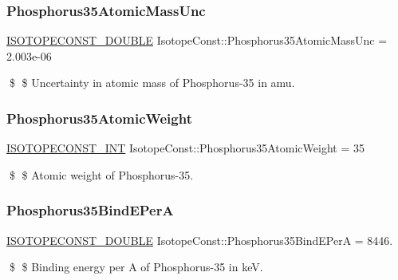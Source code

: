 \subsubsection{\texorpdfstring{Phosphorus35\+Atomic\+Mass\+Unc}{Phosphorus35AtomicMassUnc}}
{\footnotesize\ttfamily \mbox{\hyperlink{group___isotope_const-_macros_ga8f45a7272ce02c0b4c65c44636ed719a}{I\+S\+O\+T\+O\+P\+E\+C\+O\+N\+S\+T\+\_\+\+D\+O\+U\+B\+LE}} Isotope\+Const\+::\+Phosphorus35\+Atomic\+Mass\+Unc = 2.\+003e-\/06}

\$ \$ Uncertainty in atomic mass of Phosphorus-\/35 in amu. \mbox{\label{group___isotope_const-_phosphorus-_p35_gad01a86347b86b9b65ff7bbb74ddfff47}} 
\subsubsection{\texorpdfstring{Phosphorus35\+Atomic\+Weight}{Phosphorus35AtomicWeight}}
{\footnotesize\ttfamily \mbox{\hyperlink{group___isotope_const-_macros_ga5f18360b3e99483a35c32d789e62621c}{I\+S\+O\+T\+O\+P\+E\+C\+O\+N\+S\+T\+\_\+\+I\+NT}} Isotope\+Const\+::\+Phosphorus35\+Atomic\+Weight = 35}

\$ \$ Atomic weight of Phosphorus-\/35. \mbox{\label{group___isotope_const-_phosphorus-_p35_gac97c6063beba9404da470d5dcb517b99}} 
\subsubsection{\texorpdfstring{Phosphorus35\+Bind\+E\+PerA}{Phosphorus35BindEPerA}}
{\footnotesize\ttfamily \mbox{\hyperlink{group___isotope_const-_macros_ga8f45a7272ce02c0b4c65c44636ed719a}{I\+S\+O\+T\+O\+P\+E\+C\+O\+N\+S\+T\+\_\+\+D\+O\+U\+B\+LE}} Isotope\+Const\+::\+Phosphorus35\+Bind\+E\+PerA = 8446.}

\$ \$ Binding energy per A of Phosphorus-\/35 in keV. \mbox{\label{group___isotope_const-_phosphorus-_p35_gad5852169539155fa43642e543f036418}} 
